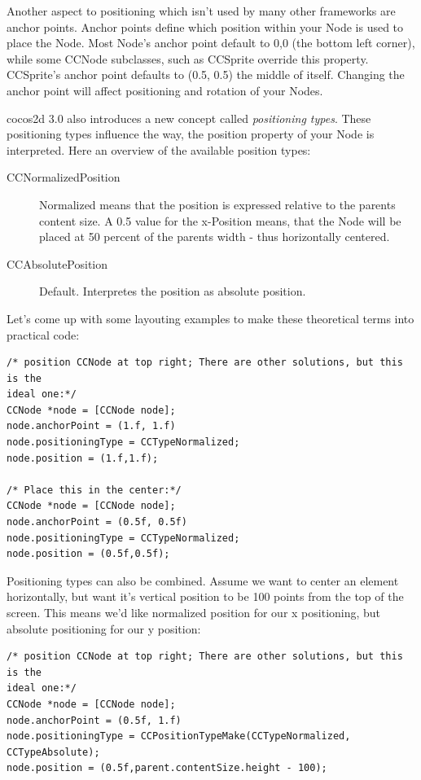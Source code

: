 \documentclass{scrreprt}
\newcommand{\cocos}{cocos2d}
\begin{document}
Another aspect to positioning which isn't used by many other frameworks
are anchor points. Anchor points define which position within your Node is used
to place the Node. Most Node's anchor point default to 0,0 (the bottom left
corner), while some CCNode subclasses, such as CCSprite override this property.
CCSprite's anchor point defaults to (0.5, 0.5) the middle of itself.
Changing the anchor point will affect positioning and rotation of your Nodes.

\cocos{} 3.0 also introduces a new concept called \textit{positioning types}.
These positioning types influence the way, the position property of your Node is
interpreted. Here an overview of the available position types:

\begin{description}
  \item[CCNormalizedPosition] Normalized means that the position is expressed
  relative to the parents content size. A 0.5 value for the x-Position means,
  that the Node will be placed at 50 percent of the parents width - thus
  horizontally centered.
  \item[CCAbsolutePosition] Default. Interpretes the position as absolute
  position.
\end{description}

Let's come up with some layouting examples to make these theoretical terms into
practical code:

\begin{lstlisting}
/* position CCNode at top right; There are other solutions, but this is the
ideal one:*/
CCNode *node = [CCNode node];
node.anchorPoint = (1.f, 1.f)
node.positioningType = CCTypeNormalized;
node.position = (1.f,1.f);

/* Place this in the center:*/ 
CCNode *node = [CCNode node];
node.anchorPoint = (0.5f, 0.5f)
node.positioningType = CCTypeNormalized;
node.position = (0.5f,0.5f);
\end{lstlisting}

Positioning types can also be combined. Assume we want to center an element
horizontally, but want it's vertical position to be 100 points from the top of
the screen. This means we'd like normalized position for our x positioning, but
absolute positioning for our y position:

\begin{lstlisting}
/* position CCNode at top right; There are other solutions, but this is the
ideal one:*/
CCNode *node = [CCNode node];
node.anchorPoint = (0.5f, 1.f)
node.positioningType = CCPositionTypeMake(CCTypeNormalized, CCTypeAbsolute);
node.position = (0.5f,parent.contentSize.height - 100);
\end{lstlisting}
 
\end{document}
